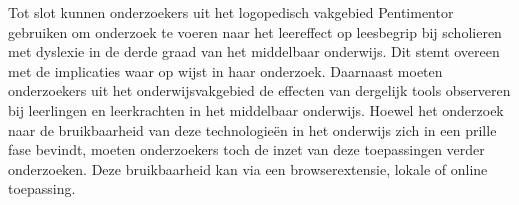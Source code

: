 \medspace

Tot slot kunnen onderzoekers uit het logopedisch vakgebied Pentimentor gebruiken om onderzoek te voeren naar het leereffect op leesbegrip bij scholieren met dyslexie in de derde graad van het middelbaar onderwijs. Dit stemt overeen met de implicaties waar \textcite{Gooding2022} op wijst in haar onderzoek. Daarnaast moeten onderzoekers uit het onderwijsvakgebied de effecten van dergelijk tools observeren bij leerlingen en leerkrachten in het middelbaar onderwijs. Hoewel het onderzoek naar de bruikbaarheid van deze technologieën in het onderwijs zich in een prille fase bevindt, moeten onderzoekers toch de inzet van deze toepassingen verder onderzoeken. Deze bruikbaarheid kan via een browserextensie, lokale of online toepassing.